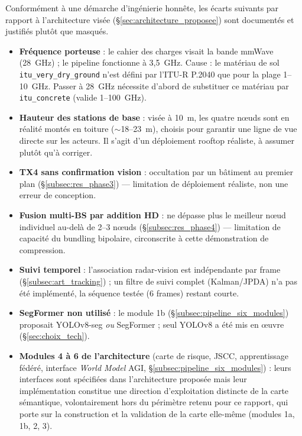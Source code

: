 \documentclass[12pt,a4paper,titlepage]{article}
\begin{document}
Conformément à une démarche d'ingénierie honnête, les écarts suivants par rapport à l'architecture visée (\S\ref{sec:architecture_proposee}) sont documentés et justifiés plutôt que masqués.

\begin{itemize}[leftmargin=1.5em]
    \item \textbf{Fréquence porteuse} : le cahier des charges visait la bande mmWave (28~GHz) ; le pipeline fonctionne à 3,5~GHz. Cause : le matériau de sol \texttt{itu\_very\_dry\_ground} n'est défini par l'ITU-R P.2040 que pour la plage 1--10~GHz. Passer à 28~GHz nécessite d'abord de substituer ce matériau par \texttt{itu\_concrete} (valide 1--100~GHz).
    \item \textbf{Hauteur des stations de base} : visée à 10~m, les quatre n\oe uds sont en réalité montés en toiture ($\sim$18--23~m), choisis pour garantir une ligne de vue directe sur les acteurs. Il s'agit d'un déploiement rooftop réaliste, à assumer plutôt qu'à corriger.
    \item \textbf{TX4 sans confirmation vision} : occultation par un bâtiment au premier plan (\S\ref{subsec:res_phase3}) --- limitation de déploiement réaliste, non une erreur de conception.
    \item \textbf{Fusion multi-BS par addition HD} : ne dépasse plus le meilleur n\oe ud individuel au-delà de 2--3 n\oe uds (\S\ref{subsec:res_phase4}) --- limitation de capacité du bundling bipolaire, circonscrite à cette démonstration de compression.
    \item \textbf{Suivi temporel} : l'association radar-vision est indépendante par frame (\S\ref{subsec:art_tracking}) ; un filtre de suivi complet (Kalman/JPDA) n'a pas été implémenté, la séquence testée (6 frames) restant courte.
    \item \textbf{SegFormer non utilisé} : le module 1b (\S\ref{subsec:pipeline_six_modules}) proposait YOLOv8-seg \textit{ou} SegFormer ; seul YOLOv8 a été mis en \oe uvre (\S\ref{sec:choix_tech}).
    \item \textbf{Modules 4 à 6 de l'architecture} (carte de risque, JSCC, apprentissage fédéré, interface \textit{World Model} AGI, \S\ref{subsec:pipeline_six_modules}) : leurs interfaces sont spécifiées dans l'architecture proposée mais leur implémentation constitue une direction d'exploitation distincte de la carte sémantique, volontairement hors du périmètre retenu pour ce rapport, qui porte sur la construction et la validation de la carte elle-même (modules 1a, 1b, 2, 3).
\end{itemize}
\end{document}
